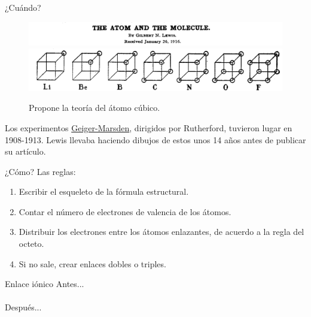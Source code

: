 \documentclass{beamer}
\begin{document}
  \begin{frame}{¿Cuándo?}
    \begin{figure}
      \centering
      \includegraphics[width=1\linewidth]{imgs/Lewis-paper-01}
      \includegraphics[width=0.7\linewidth]{imgs/Lewis-paper-02}
      \caption{Propone la teoría del átomo cúbico.}
      \label{fig:lewis-paper-01}
    \end{figure}
    Los experimentos \href{https://en.wikipedia.org/wiki/Geiger-Marsden_experiments}{Geiger-Marsden}, dirigidos por Rutherford, tuvieron lugar en 1908-1913. Lewis llevaba haciendo dibujos de estos unos 14 años antes de publicar su artículo.
  \end{frame}
  \begin{frame}{¿Cómo?}
    Las reglas:
    \begin{enumerate}
      \item Escribir el esqueleto de la fórmula estructural.
      \item Contar el número de electrones de valencia de los átomos.
      \item Distribuir los electrones entre los átomos enlazantes, de acuerdo a la regla del octeto.
      \item Si no sale, crear enlaces dobles o triples.
    \end{enumerate}
  \end{frame}
  \begin{frame}{Enlace iónico}
    \centering
    Antes...\\
     \quad\quad {}\\
    Después...\\
     
  \end{frame}
\end{document}
